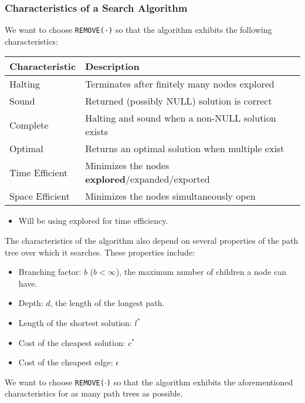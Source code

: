 \subsubsection{Characteristics of a Search Algorithm}
\begin{definition}
    We want to choose \texttt{REMOVE(·)} so that the algorithm exhibits the following characteristics:

    \begin{center}
        \begin{tabular}{|p{3cm}|p{9cm}|}
        \hline
        \textbf{Characteristic} & \textbf{Description} \\ \hline
        Halting & Terminates after finitely many nodes explored \\ \hline
        Sound & Returned (possibly NULL) solution is correct \\ \hline
        Complete & Halting and sound when a non-NULL solution exists \\ \hline
        Optimal & Returns an optimal solution when multiple exist \\ \hline
        Time Efficient & Minimizes the nodes \textbf{explored}/expanded/exported \\ \hline
        Space Efficient & Minimizes the nodes simultaneously open \\ \hline
        \end{tabular}
    \end{center}
    \vspace{1em}   
    \begin{itemize}
        \item Will be using explored for time efficiency.
    \end{itemize} 
    \vspace{1em}

    The characteristics of the algorithm also depend on several properties of the path tree over which it searches. These properties include:
    \begin{itemize}
        \item Branching factor: $b$ ($b < \infty$), the maximum number of children a node can have.
        \item Depth: $d$, the length of the longest path.
        \item Length of the shortest solution: $l^*$
        \item Cost of the cheapest solution: $c^*$
        \item Cost of the cheapest edge: $\epsilon$ 
    \end{itemize}

    We want to choose \texttt{REMOVE($\cdot$)} so that the algorithm exhibits the aforementioned characteristics for as many path trees as possible.

\end{definition}


